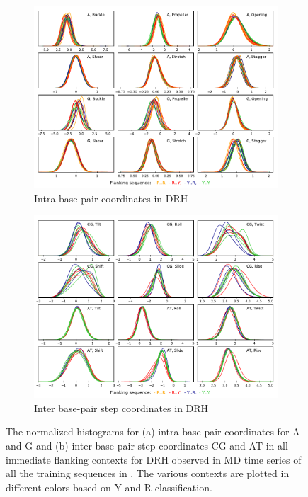 \begin{figure}[H]
  \begin{subfigure}{15cm}
    \centering\includegraphics[width=15cm,trim=0cm 0cm 0cm 0.6cm]{images/HDR_intra_A_G.pdf}
    \caption{Intra base-pair coordinates in DRH}
  \end{subfigure}
  \begin{subfigure}{15cm}
    \centering\includegraphics[width=15cm]{images/HDR_inter_CG_AU.pdf}
    \caption{Inter base-pair step coordinates in DRH}
  \end{subfigure}
\caption{The normalized histograms for (a) intra base-pair coordinates for A and G and (b) inter base-pair step coordinates CG and AT in all immediate flanking contexts for DRH observed in MD time series of all the training sequences in \Lbdrh. 
The various contexts are plotted in different colors based on Y and R classification. 
}
\label{c3:fig_distr_4}
\end{figure}

